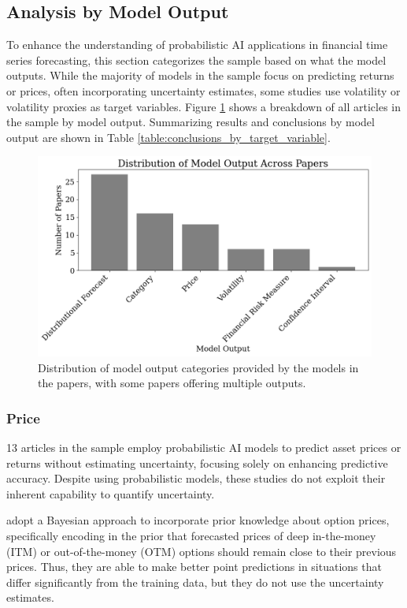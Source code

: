 \subsection{Analysis by Model Output}
\label{sec:analysis_by_model_output}
To enhance the understanding of probabilistic AI applications in financial time series forecasting, this section categorizes the sample based on what the model outputs. While the majority of models in the sample focus on predicting returns or prices, often incorporating uncertainty estimates, some studies use volatility or volatility proxies as target variables. Figure \ref{fig:model_output} shows a breakdown of all articles in the sample by model output. Summarizing results and conclusions by model output are shown in Table \ref{table:conclusions_by_target_variable}.

\begin{figure}[H]
    \centering
    \includegraphics[width=1\linewidth]{Images/model_output.png}
    \caption{Distribution of model output categories provided by the models in the papers, with some papers offering multiple outputs.}
    \label{fig:model_output}
\end{figure}

\subsubsection{Price}
13 articles in the sample employ probabilistic AI models to predict asset prices or returns without estimating uncertainty, focusing solely on enhancing predictive accuracy. Despite using probabilistic models, these studies do not exploit their inherent capability to quantify uncertainty.

\textcite{jang2018generative} adopt a Bayesian approach to incorporate prior knowledge about option prices, specifically encoding in the prior that forecasted prices of deep in-the-money (ITM) or out-of-the-money (OTM) options should remain close to their previous prices. Thus, they are able to make better point predictions in situations that differ significantly from the training data, but they do not use the uncertainty estimates.

